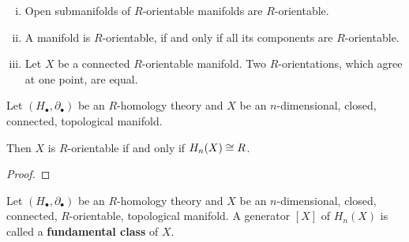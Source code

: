 	\begin{lemma}\vspace{-1.5em}
		\begin{enumerate}[(i)]
			\item{
				Open submanifolds of $R$-orientable manifolds are $R$-orientable.
			}
			\item{
				A manifold is $R$-orientable, if and only if all its components are $R$-orientable.
			}
			\item{
				Let $X$ be a connected $R$-orientable manifold. Two $R$-orientations, which agree at one point, are equal.
			}
		\end{enumerate}
	\end{lemma}

	\begin{proposition}
		Let $(H_\bullet, \partial_\bullet)$ be an $R$-homology theory and $X$ be an $n$-dimensional, closed, connected, topological manifold. 

		Then $X$ is $R$-orientable if and only if $H_n(X) \cong R$.
	\end{proposition}
	\begin{proof}
	\end{proof}

	\begin{definition}
		Let $(H_\bullet, \partial_\bullet)$ be an $R$-homology theory and $X$ be an $n$-dimensional, closed, connected, $R$-orientable, topological manifold. A generator $[X]$ of $H_n(X)$ is called a \textbf{fundamental class} of $X$.
	\end{definition}
